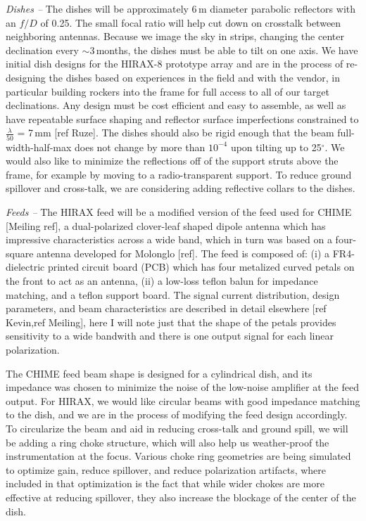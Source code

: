 \documentclass[]{spie}  %
\begin{document}
\textit{Dishes --} The dishes will be approximately 6\,m diameter parabolic reflectors with an $f/D$ of 0.25. The small focal ratio will help cut down on crosstalk between neighboring antennas.  Because we image the sky in strips, changing the center declination every $\sim$3\,months, the dishes must be able to tilt on one axis. We have initial dish designs for the HIRAX-8 prototype array and are in the process of re-designing the dishes based on experiences in the field and with the vendor, in particular building rockers into the frame for full access to all of our target declinations. Any design must be cost efficient and easy to assemble, as well as have repeatable surface shaping and reflector surface imperfections constrained to $\frac{\lambda}{50}$ = 7\,mm [ref Ruze]. The dishes should also be rigid enough that the beam full-width-half-max does not change by more than $10^{-4}$ upon tilting up to 25$^{\circ}$. We would also like to minimize the reflections off of the support struts above the frame, for example by moving to a radio-transparent support. To reduce ground spillover and cross-talk, we are considering adding reflective collars to the dishes. \newline


\textit{Feeds -- } The HIRAX feed will be a modified version of the feed used for CHIME [Meiling ref], a dual-polarized clover-leaf shaped dipole antenna which has impressive characteristics across a wide band, which in turn was based on a four-square antenna developed for Molonglo [ref]. The feed is composed of: (i) a FR4-dielectric printed circuit board (PCB) which has four metalized curved petals on the front to act as an antenna, (ii) a low-loss teflon balun for impedance matching, and a teflon support board. The signal current distribution, design parameters, and beam characteristics are described in detail elsewhere [ref Kevin,ref Meiling], here I will note just that the shape of the petals provides sensitivity to a wide bandwith and there is one output signal for each linear polarization. \newline

The CHIME feed beam shape is designed for a cylindrical dish, and its impedance was chosen to minimize the noise of the low-noise amplifier at the feed output. For HIRAX, we would like circular beams with good impedance matching to the dish, and we are in the process of modifying the feed design accordingly. To circularize the beam and aid in reducing cross-talk and ground spill, we will be adding a ring choke structure, which will also help us weather-proof the instrumentation at the focus. Various choke ring geometries are being simulated to optimize gain, reduce spillover, and reduce polarization artifacts, where included in that optimization is the fact that while wider chokes are more effective at reducing spillover, they also increase the blockage of the center of the dish. \newline
\end{document}
